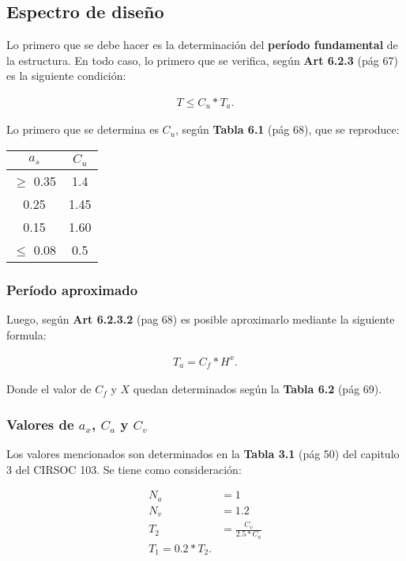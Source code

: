 \documentclass[../main.tex]{subfiles}
\begin{document}
\subsection{Espectro de diseño}

Lo primero que se debe hacer es la determinación del \textbf{período fundamental}
de la estructura. En todo caso, lo primero que se verifica, según \textbf{Art 6.2.3}
(pág 67) es la siguiente condición:

\begin{align*}
  T \leq C_u * T_a
.\end{align*}

Lo primero que se determina es $C_u$, según  \textbf{Tabla 6.1} (pág 68), que se
reproduce:

\begin{center}
  \begin{tabular}{|c|c|}
    \hline
    $a_s$ & $C_u$ \\
    \hline
    $\geq $ 0.35 & 1.4 \\
    \hline
    0.25 & 1.45 \\
    \hline
    0.15 & 1.60 \\
    \hline
    $\leq $ 0.08  & 0.5 \\
    \hline
 \end{tabular} 
\end{center}

\subsubsection{Período aproximado}


Luego, según \textbf{Art 6.2.3.2} (pag 68) es posible aproximarlo mediante
la siguiente formula:

\begin{align*}
  T_a = C_f * H^x
.\end{align*}

Donde el valor de $C_f$ y $X$ quedan determinados según la \textbf{Tabla 6.2}
(pág 69). 

 \subsubsection{Valores de $a_x$,  $C_a$ y  $C_v$}

 Los valores mencionados son determinados en la \textbf{Tabla 3.1} (pág 50) del
 capitulo 3 del CIRSOC 103. Se tiene como consideración:

 \begin{align*}
   N_a &= 1 \\[5pt]
   N_v &= 1.2 \\[5pt]
   T_2 &= \frac{C_v}{2.5*C_a} \\[5pt]
   T_1 = 0.2 * T_2
 .\end{align*}
\end{document}
